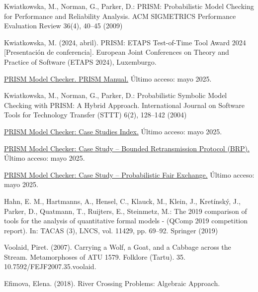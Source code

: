 \documentclass[runningheads]{llncs}
\begin{document}
\begin{thebibliography}{21}
Kwiatkowska, M., Norman, G., Parker, D.: PRISM: Probabilistic Model Checking for Performance and Reliability Analysis. ACM SIGMETRICS Performance Evaluation Review 36(4), 40--45 (2009)

Kwiatkowska, M. (2024, abril). PRISM: ETAPS Test-of-Time Tool Award 2024 [Presentación de conferencia]. European Joint Conferences on Theory and Practice of Software (ETAPS 2024), Luxemburgo.

\href{https://www.prismmodelchecker.org/manual/Main/AllOnOnePage}{PRISM Model Checker. PRISM Manual.} Último acceso: mayo 2025.

Kwiatkowska, M., Norman, G., Parker, D.: Probabilistic Symbolic Model Checking with PRISM: A Hybrid Approach. International Journal on Software Tools for Technology Transfer (STTT) 6(2), 128--142 (2004)

\href{https://www.prismmodelchecker.org/casestudies/index.php}{PRISM Model Checker: Case Studies Index.} Último acceso: mayo 2025.

\href{https://www.prismmodelchecker.org/casestudies/brp.php}{PRISM Model Checker: Case Study – Bounded Retransmission Protocol (BRP).} Último acceso: mayo 2025.

\href{https://www.prismmodelchecker.org/casestudies/fairexchange.php}{PRISM Model Checker: Case Study – Probabilistic Fair Exchange.} Último acceso: mayo 2025.

Hahn, E. M., Hartmanns, A., Hensel, C., Klauck, M., Klein, J., Kretínský, J., Parker, D., Quatmann, T., Ruijters, E., Steinmetz, M.: The 2019 comparison of tools for the analysis of quantitative formal models - (QComp 2019 competition report). In: TACAS (3), LNCS, vol. 11429, pp. 69–92. Springer (2019)

Voolaid, Piret. (2007). Carrying a Wolf, a Goat, and a Cabbage across the Stream. Metamorphoses of ATU 1579. Folklore (Tartu). 35. 10.7592/FEJF2007.35.voolaid. 

Efimova, Elena. (2018). River Crossing Problems: Algebraic Approach.

\end{thebibliography}
\end{document}
